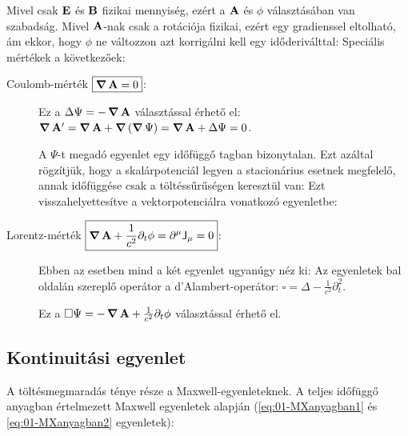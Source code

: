    Mivel csak $\mathbf{E}$ és $\mathbf{B}$ fizikai mennyiség, ezért a $\mathbf{A}$ és $\phi$ választásában van szabadság. Mivel $\mathbf{A}$-nak csak a rotációja fizikai, ezért egy gradienssel eltolható, ám ekkor, hogy $\phi$ ne változzon azt korrigálni kell egy időderiválttal:
   Speciális mértékek a következőek:
   \begin{description}
    \item[Coulomb-mérték $\boxed{\mathop{\boldsymbol{\nabla}}\nolimits{\mathbf{A}}=0}$:] Ez a $\Delta\Psi=-\mathop{\boldsymbol{\nabla}}\nolimits{\mathbf{A}}$ választással érhető el: $\mathop{\boldsymbol{\nabla}}\nolimits{\mathbf{A}'}=\mathop{\boldsymbol{\nabla}}\nolimits{\mathbf{A}}+\mathop{\boldsymbol{\nabla}}\nolimits{(\mathop{\boldsymbol{\nabla}}\nolimits{\Psi})}=\mathop{\boldsymbol{\nabla}}\nolimits{\mathbf{A}}+\Delta{\Psi}=0$. 
    
    A $\Psi$-t megadó egyenlet egy időfüggő tagban bizonytalan. Ezt azáltal rögzítjük, hogy a skalárpotenciál legyen a stacionárius esetnek megfelelő, annak időfüggése csak a töltéssűrűségen keresztül van:
    Ezt visszahelyettesítve a vektorpotenciálra vonatkozó egyenletbe:
    \item[Lorentz-mérték $\boxed{\mathop{\boldsymbol{\nabla}}\nolimits{\mathbf{A}}+\frac{1}{c^2}\partial_t\phi=\partial^\mu\mathsf{J}_\mu=0}$:] Ebben az esetben mind a két egyenlet ugyanúgy néz ki:
    Az egyenletek bal oldalán szereplő operátor a d'Alambert-operátor: $\square=\Delta-\frac{1}{c^2}\partial_t^2$.
    
    Ez a $\square\Psi=-\mathop{\boldsymbol{\nabla}}\nolimits{\mathbf{A}}+\frac{1}{c^2}\partial_t\phi$ választással érhető el.
   \end{description} 
   
  \subsection{Kontinuitási egyenlet}
   
   A töltésmegmaradás ténye része a Maxwell-egyenleteknek. A teljes időfüggő anyagban értelmezett Maxwell egyenletek alapján (\eqref{eq:01-MXanyagban1} és \eqref{eq:01-MXanyagban2} egyenletek):
   
